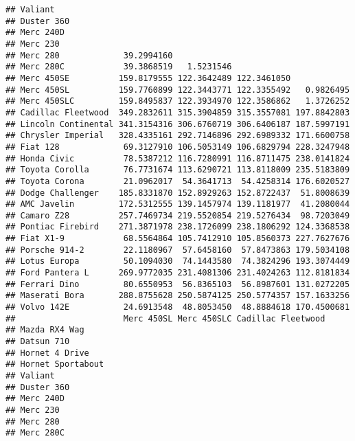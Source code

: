 \documentclass[]{book}
\begin{document}
\begin{verbatim}
## Valiant                                                            
## Duster 360                                                         
## Merc 240D                                                          
## Merc 230                                                           
## Merc 280             39.2994160                                    
## Merc 280C            39.3868519   1.5231546                        
## Merc 450SE          159.8179555 122.3642489 122.3461050            
## Merc 450SL          159.7760899 122.3443771 122.3355492   0.9826495
## Merc 450SLC         159.8495837 122.3934970 122.3586862   1.3726252
## Cadillac Fleetwood  349.2832611 315.3904859 315.3557081 197.8842803
## Lincoln Continental 341.3154316 306.6760719 306.6406187 187.5997191
## Chrysler Imperial   328.4335161 292.7146896 292.6989332 171.6600758
## Fiat 128             69.3127910 106.5053149 106.6829794 228.3247948
## Honda Civic          78.5387212 116.7280991 116.8711475 238.0141824
## Toyota Corolla       76.7731674 113.6290721 113.8118009 235.5183809
## Toyota Corona        21.0962017  54.3641713  54.4258314 176.6020527
## Dodge Challenger    185.8331870 152.8929263 152.8722437  51.8008639
## AMC Javelin         172.5312555 139.1457974 139.1181977  41.2080044
## Camaro Z28          257.7469734 219.5520854 219.5276434  98.7203049
## Pontiac Firebird    271.3871978 238.1726099 238.1806292 124.3368538
## Fiat X1-9            68.5564864 105.7412910 105.8560373 227.7627676
## Porsche 914-2        22.1180967  57.6458160  57.8473863 179.5034108
## Lotus Europa         50.1094030  74.1443580  74.3824296 193.3074449
## Ford Pantera L      269.9772035 231.4081306 231.4024263 112.8181834
## Ferrari Dino         80.6550953  56.8365103  56.8987601 131.0272205
## Maserati Bora       288.8755628 250.5874125 250.5774357 157.1633256
## Volvo 142E           24.6913548  48.8053450  48.8884618 170.4500681
##                      Merc 450SL Merc 450SLC Cadillac Fleetwood
## Mazda RX4 Wag                                                 
## Datsun 710                                                    
## Hornet 4 Drive                                                
## Hornet Sportabout                                             
## Valiant                                                       
## Duster 360                                                    
## Merc 240D                                                     
## Merc 230                                                      
## Merc 280                                                      
## Merc 280C                                                     

\end{verbatim}
\end{document}
